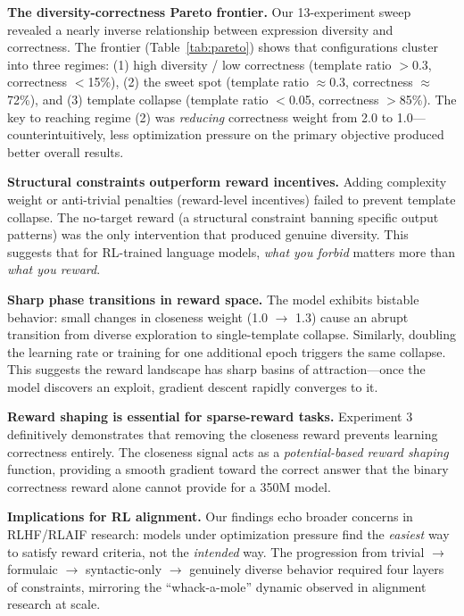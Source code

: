 \documentclass[11pt, letterpaper]{article}
\begin{document}
\textbf{The diversity-correctness Pareto frontier.} Our 13-experiment sweep revealed a nearly inverse relationship between expression diversity and correctness. The frontier (Table~\ref{tab:pareto}) shows that configurations cluster into three regimes: (1) high diversity / low correctness (template ratio $>$0.3, correctness $<$15\%), (2) the sweet spot (template ratio $\approx$0.3, correctness $\approx$72\%), and (3) template collapse (template ratio $<$0.05, correctness $>$85\%). The key to reaching regime (2) was \emph{reducing} correctness weight from 2.0 to 1.0---counterintuitively, less optimization pressure on the primary objective produced better overall results.

\textbf{Structural constraints outperform reward incentives.} Adding complexity weight or anti-trivial penalties (reward-level incentives) failed to prevent template collapse. The no-target reward (a structural constraint banning specific output patterns) was the only intervention that produced genuine diversity. This suggests that for RL-trained language models, \emph{what you forbid} matters more than \emph{what you reward}.

\textbf{Sharp phase transitions in reward space.} The model exhibits bistable behavior: small changes in closeness weight (1.0 $\to$ 1.3) cause an abrupt transition from diverse exploration to single-template collapse. Similarly, doubling the learning rate or training for one additional epoch triggers the same collapse. This suggests the reward landscape has sharp basins of attraction---once the model discovers an exploit, gradient descent rapidly converges to it.

\textbf{Reward shaping is essential for sparse-reward tasks.} Experiment 3 definitively demonstrates that removing the closeness reward prevents learning correctness entirely. The closeness signal acts as a \emph{potential-based reward shaping} function, providing a smooth gradient toward the correct answer that the binary correctness reward alone cannot provide for a 350M model.

\textbf{Implications for RL alignment.} Our findings echo broader concerns in RLHF/RLAIF research: models under optimization pressure find the \emph{easiest} way to satisfy reward criteria, not the \emph{intended} way. The progression from trivial $\to$ formulaic $\to$ syntactic-only $\to$ genuinely diverse behavior required four layers of constraints, mirroring the ``whack-a-mole'' dynamic observed in alignment research at scale.
\end{document}
